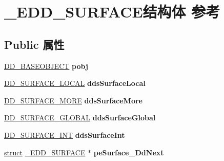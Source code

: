 \hypertarget{struct___e_d_d___s_u_r_f_a_c_e}{}\section{\+\_\+\+E\+D\+D\+\_\+\+S\+U\+R\+F\+A\+C\+E结构体 参考}
\label{struct___e_d_d___s_u_r_f_a_c_e}
\subsection*{Public 属性}
\begin{DoxyCompactItemize}
\item 
\mbox{\label{struct___e_d_d___s_u_r_f_a_c_e_a713b00ce647b09a5f11dfb5a2383d2b2}} 
\hyperlink{struct___d_d___b_a_s_e_o_b_j_e_c_t}{D\+D\+\_\+\+B\+A\+S\+E\+O\+B\+J\+E\+CT} {\bfseries pobj}
\item 
\mbox{\label{struct___e_d_d___s_u_r_f_a_c_e_a73aa9480769bde5fa1df43e9f6b473ee}} 
\hyperlink{struct___d_d___s_u_r_f_a_c_e___l_o_c_a_l}{D\+D\+\_\+\+S\+U\+R\+F\+A\+C\+E\+\_\+\+L\+O\+C\+AL} {\bfseries dds\+Surface\+Local}
\item 
\mbox{\label{struct___e_d_d___s_u_r_f_a_c_e_a9488eaf4f18c567018ba1b7c8a16b982}} 
\hyperlink{struct___d_d___s_u_r_f_a_c_e___m_o_r_e}{D\+D\+\_\+\+S\+U\+R\+F\+A\+C\+E\+\_\+\+M\+O\+RE} {\bfseries dds\+Surface\+More}
\item 
\mbox{\label{struct___e_d_d___s_u_r_f_a_c_e_a22cbf2e865ee180c36c6cd02f78d81aa}} 
\hyperlink{struct___d_d___s_u_r_f_a_c_e___g_l_o_b_a_l}{D\+D\+\_\+\+S\+U\+R\+F\+A\+C\+E\+\_\+\+G\+L\+O\+B\+AL} {\bfseries dds\+Surface\+Global}
\item 
\mbox{\label{struct___e_d_d___s_u_r_f_a_c_e_a1f4602267fa8239fa88d324404dd2cea}} 
\hyperlink{struct___d_d___s_u_r_f_a_c_e___i_n_t}{D\+D\+\_\+\+S\+U\+R\+F\+A\+C\+E\+\_\+\+I\+NT} {\bfseries dds\+Surface\+Int}
\item 
\mbox{\label{struct___e_d_d___s_u_r_f_a_c_e_a6935baf381ef982c2d7ce85b40643c51}} 
\hyperlink{interfacestruct}{struct} \hyperlink{struct___e_d_d___s_u_r_f_a_c_e}{\+\_\+\+E\+D\+D\+\_\+\+S\+U\+R\+F\+A\+CE} $\ast$ {\bfseries pe\+Surface\+\_\+\+Dd\+Next}

\end{DoxyCompactItemize}
